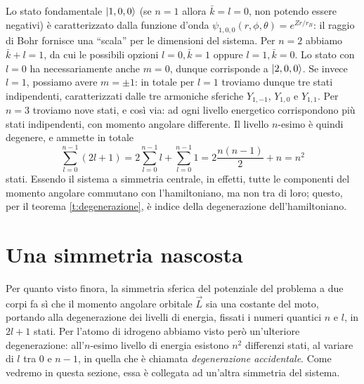 Lo stato fondamentale $\left|{1,0,0}\right\rangle$ (se $n=1$ allora $\bar{k}=l=0$, non potendo essere negativi) è caratterizzato dalla funzione d'onda $\psi_{1,0,0}(r,\phi,\theta)=e^{Zr/r_B}$: il raggio di Bohr fornisce una ``scala'' per le dimensioni del sistema.
Per $n=2$ abbiamo $\bar{k}+l=1$, da cui le possibili opzioni $l=0,\bar{k}=1$ oppure $l=1,\bar{k}=0$.
Lo stato con $l=0$ ha necessariamente anche $m=0$, dunque corrisponde a $\left|{2,0,0}\right\rangle$.
Se invece $l=1$, possiamo avere $m=\pm 1$: in totale per $l=1$ troviamo dunque tre stati indipendenti, caratterizzati dalle tre armoniche sferiche $Y_{1,-1}$, $Y_{1,0}$ e $Y_{1,1}$.
Per $n=3$ troviamo nove stati, e cos\`i via: ad ogni livello energetico corrispondono più stati indipendenti, con momento angolare differente.
Il livello $n$-esimo è quindi degenere, e ammette in totale
\begin{equation}
	\sum_{l=0}^{n-1}(2l+1)=2\sum_{l=0}^{n-1}l+\sum_{l=0}^{n-1}1=2\frac{n(n-1)}2+n=n^2
\end{equation}
stati.
Essendo il sistema a simmetria centrale, in effetti, tutte le componenti del momento angolare commutano con l'hamiltoniano, ma non tra di loro; questo, per il teorema \ref{t:degenerazione}, è indice della degenerazione dell'hamiltoniano.

\section{Una simmetria nascosta}
Per quanto visto finora, la simmetria sferica del potenziale del problema a due corpi fa s\`i che il momento angolare orbitale $\vec L$ sia una costante del moto, portando alla degenerazione dei livelli di energia, fissati i numeri quantici $n$ e $l$, in $2l+1$ stati.
Per l'atomo di idrogeno abbiamo visto però un'ulteriore degenerazione: all'$n$-esimo livello di energia esistono $n^2$ differenzi stati, al variare di $l$ tra $0$ e $n-1$, in quella che è chiamata \emph{degenerazione accidentale}.
Come vedremo in questa sezione, essa è collegata ad un'altra simmetria del sistema.

